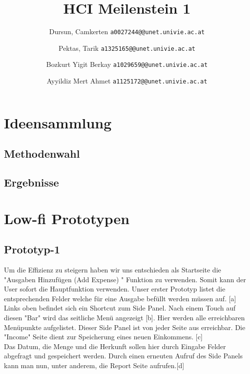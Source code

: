 \documentclass[runningheads,a4paper]{llncs}
\begin{document}
\mainmatter  %

\title{HCI Meilenstein 1}


\author{
  Dursun, Camkerten
  \texttt{a0027244@@unet.univie.ac.at}
  \and
  Pektas, Tarik
  \texttt{a1325165@@unet.univie.ac.at}
  \and
  Bozkurt Yigit Berkay
  \texttt{a1029659@@unet.univie.ac.at}
  \and
  Ayyildiz Mert Ahmet
  \texttt{a1125172@@unet.univie.ac.at}
}



\maketitle

\section{Ideensammlung}
\subsection{Methodenwahl}
\subsection{Ergebnisse}

\clearpage

\section{Low-fi Prototypen}
\subsection{Prototyp-1}

Um die Effizienz zu steigern haben wir uns entschieden als Startseite die "Ausgaben Hinzufügen (Add Expense) " Funktion zu verwenden. Somit kann der User sofort die Hauptfunktion verwenden. 
Unser erster Prototyp listet die entsprechenden Felder welche für eine Ausgabe befüllt werden müssen auf. [a]
Links oben befindet sich ein Shortcut zum Side Panel. Nach einem Touch auf diesen "Bar" wird das seitliche Menü angezeigt [b]. Hier werden alle erreichbaren Menüpunkte aufgelistet. Dieser Side Panel ist von jeder Seite aus erreichbar.
Die "Income" Seite dient zur Speicherung eines neuen Einkommens. [c]\\Das Datum, die Menge und die Herkunft sollen hier durch Eingabe Felder abgefragt und gespeichert werden. Durch einen erneuten Aufruf des Side Panels kann man nun, unter anderem, die Report Seite aufrufen.[d]
\end{document}
